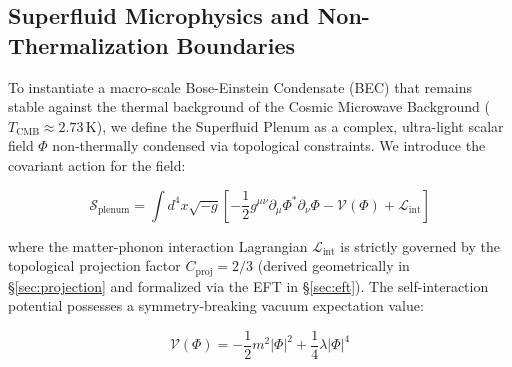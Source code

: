 \documentclass[aps,prd,10pt,twocolumn,superscriptaddress,nofootinbib,floatfix]{revtex4-2}
\begin{document}
\subsection{\label{sec:microphysics}Superfluid Microphysics and Non-Thermalization Boundaries}

To instantiate a macro-scale Bose-Einstein Condensate (BEC) that remains stable against the thermal background of the Cosmic Microwave Background ($T_{\text{CMB}} \approx 2.73\,\text{K}$), we define the Superfluid Plenum as a complex, ultra-light scalar field $\Phi$ non-thermally condensed via topological constraints. We introduce the covariant action for the field:

\begin{equation}
\mathcal{S}_{\text{plenum}} = \int d^4x \sqrt{-g} \left[ -\frac{1}{2} g^{\mu\nu} \partial_\mu \Phi^* \partial_\nu \Phi - \mathcal{V}(\Phi) + \mathcal{L}_{\text{int}} \right]
\end{equation}

where the matter-phonon interaction Lagrangian $\mathcal{L}_{\text{int}}$ is strictly governed by the topological projection factor $C_{\text{proj}} = 2/3$ (derived geometrically in \S\ref{sec:projection} and formalized via the EFT in \S\ref{sec:eft}). The self-interaction potential possesses a symmetry-breaking vacuum expectation value:

\begin{equation}
\mathcal{V}(\Phi) = -\frac{1}{2} m^2 |\Phi|^2 + \frac{1}{4} \lambda |\Phi|^4
\end{equation}
\end{document}
